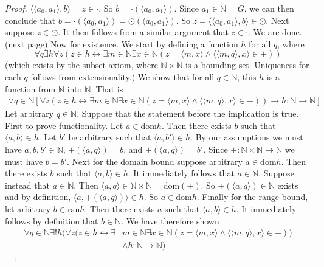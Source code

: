 \documentclass{report}
\begin{document}
\begin{proof}
$\langle\langle a_0,a_1\rangle,b\rangle=z\in\cdot$. So $b=\cdot(\langle a_0,a_1\rangle)$.
Since $a_1\in\mathbb N=G$, we can then conclude that $b=\cdot(\langle a_0,a_1\rangle)=\odot(\langle a_0,a_1\rangle)$. So $z=\langle\langle a_0,a_1\rangle,b\rangle\in\odot$. Next suppose $z\in\odot$.
It then follows from a similar argument that $z\in\cdot$. We are done.\\
(next page)\newpage
Now for existence. We start by defining a function $h$ for all $q$, where
\begin{equation*}
\forall q\exists h\forall z(z\in h\leftrightarrow\exists m\in\mathbb N\exists x\in\mathbb N(z=\langle m,x\rangle\land\langle\langle m,q\rangle,x\rangle\in+))
\end{equation*}
(which exists by the subset axiom, where $\mathbb N\times\mathbb N$ is a bounding set. Uniqueness for each $q$ follows from extensionality.) We show that for all $q\in\mathbb N$, this $h$ is a 
function from $\mathbb N$ into $\mathbb N$. That is
\begin{align*}
\forall q\in\mathbb N[\forall z(z\in h\leftrightarrow\exists m\in\mathbb N\exists x\in\mathbb N(z=\langle m,x\rangle\land\langle\langle m,q\rangle,x\rangle\in+))\to h:\mathbb N\to\mathbb N]
\end{align*}
Let arbitrary $q\in\mathbb N$. Suppose that the statement before the implication is true.
First to prove functionality. Let $a\in\text{dom}h$. Then there exists $b$ such that $\langle a,b\rangle\in h$. Let $b'$ be arbitrary such that $\langle a,b'\rangle\in h$. By our assumptions we 
must have $a,b,b'\in\mathbb N$, $+(\langle a,q\rangle)=b$, and $+(\langle a,q\rangle)=b'$. Since
$+:\mathbb N\times\mathbb N\to\mathbb N$ we must have $b=b'$. Next for the domain bound suppose arbitrary $a\in\text{dom}h$. Then there exists $b$ such that $\langle a,b\rangle\in h$. It immediately
follows that $a\in\mathbb N$. Suppose instead that $a\in\mathbb N$. Then $\langle a,q\rangle\in\mathbb N\times\mathbb N=\text{dom}(+)$.
So $+(\langle a,q\rangle)\in\mathbb N$ exists and by definition, $\langle a,+(\langle a,q\rangle)\rangle\in h$. So $a\in\text{dom}h$. Finally for the range bound, let arbitrary $b\in\text{ran}h$.
Then there exists $a$ such that $\langle a,b\rangle\in h$. It immediately follows by definition that $b\in\mathbb N$. We have therefore shown
\begin{align*}
\forall q\in\mathbb N\exists!h
(\forall z(z\in h\leftrightarrow\exists&m\in\mathbb N\exists x\in\mathbb N(z=\langle m,x\rangle\land\langle\langle m,q\rangle,x\rangle\in+))\\&\land h:\mathbb N\to\mathbb N)

\end{align*}
\end{proof}
\end{document}
